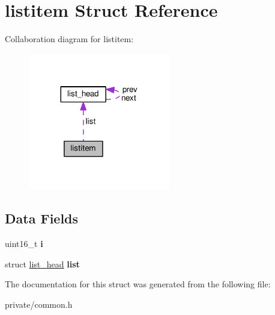 \hypertarget{structlistitem}{}\section{listitem Struct Reference}
\label{structlistitem}


Collaboration diagram for listitem\+:
\nopagebreak
\begin{figure}[H]
\begin{center}
\leavevmode
\includegraphics[width=176pt]{structlistitem__coll__graph}
\end{center}
\end{figure}
\subsection*{Data Fields}
\begin{DoxyCompactItemize}
\item 
uint16\+\_\+t {\bfseries i}\hypertarget{structlistitem_a78f7a37dba921e0b0347b960fb40bc51}{}\label{structlistitem_a78f7a37dba921e0b0347b960fb40bc51}

\item 
struct \hyperlink{structlist__head}{list\+\_\+head} {\bfseries list}\hypertarget{structlistitem_a1f00f18b91d5a820f2c43064243aa86e}{}\label{structlistitem_a1f00f18b91d5a820f2c43064243aa86e}

\end{DoxyCompactItemize}


The documentation for this struct was generated from the following file\+:\begin{DoxyCompactItemize}
\item 
private/common.\+h\end{DoxyCompactItemize}
